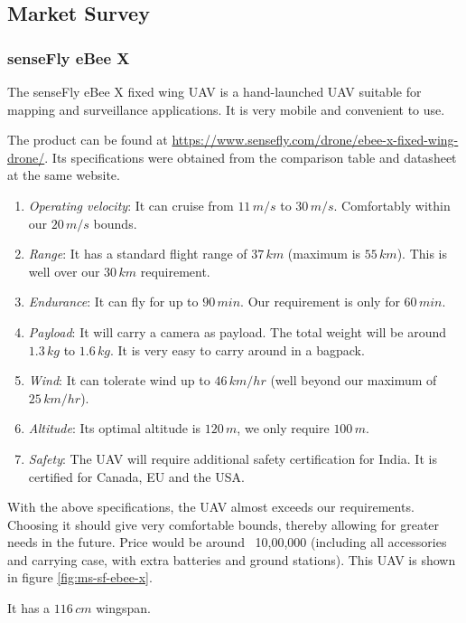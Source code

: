 \subsection{Market Survey}

\subsubsection*{senseFly eBee X}

The senseFly eBee X fixed wing UAV is a hand-launched UAV suitable for mapping and surveillance applications. It is very mobile and convenient to use. 

The product can be found at \url{https://www.sensefly.com/drone/ebee-x-fixed-wing-drone/}. Its specifications were obtained from the comparison table and datasheet at the same website.

\begin{enumerate}
    \item \textit{Operating velocity}: It can cruise from $11\,m/s$ to $30\,m/s$. Comfortably within our $20\,m/s$ bounds.
    \item \textit{Range}: It has a standard flight range of $37\,km$ (maximum is $55\,km$). This is well over our $30\,km$ requirement.
    \item \textit{Endurance}: It can fly for up to $90\,min$. Our requirement is only for $60\,min$.
    \item \textit{Payload}: It will carry a camera as payload. The total weight will be around $1.3\,kg$ to $1.6\,kg$. It is very easy to carry around in a bagpack.
    \item \textit{Wind}: It can tolerate wind up to $46\,km/hr$ (well beyond our maximum of $25\,km/hr$).
    \item \textit{Altitude}: Its optimal altitude is $120\,m$, we only require $100\,m$.
    \item \textit{Safety}: The UAV will require additional safety certification for India. It is certified for Canada, EU and the USA.
\end{enumerate}

With the above specifications, the UAV almost exceeds our requirements. Choosing it should give very comfortable bounds, thereby allowing for greater needs in the future.
Price would be around \rupee~10,00,000 (including all accessories and carrying case, with extra batteries and ground stations). This UAV is shown in figure \ref{fig:ms-sf-ebee-x}.

It has a $116\,cm$ wingspan.


